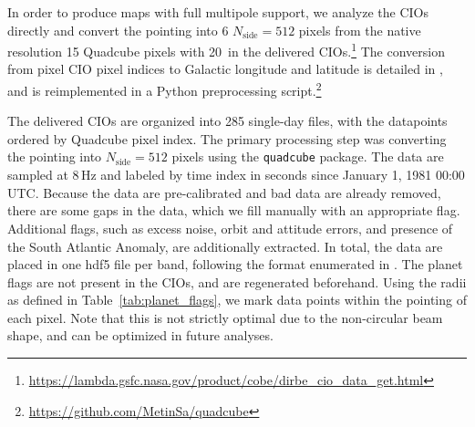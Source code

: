 \documentclass{aa}
\begin{document}
In order to produce maps with full multipole support, we analyze the CIOs directly and convert the pointing into 6 $N_\mathrm{side}=512$ pixels from the native resolution 15 Quadcube pixels with 20\arcs\ in the delivered CIOs.\footnote{\url{https://lambda.gsfc.nasa.gov/product/cobe/dirbe\_cio\_data\_get.html}} The conversion from pixel CIO pixel indices to Galactic longitude and latitude is detailed in \citet{cobe_exsupp}, and is reimplemented in a Python preprocessing script.\footnote{\url{https://github.com/MetinSa/quadcube}}

The delivered CIOs are organized into 285 single-day files, with the datapoints ordered by Quadcube pixel index. The primary processing step was converting the pointing into $N_\mathrm{side}=512$ pixels using the \texttt{quadcube} package. The data are sampled at 8\,Hz and labeled by time index in seconds since January 1, 1981 00:00 UTC. Because the data are pre-calibrated and bad data are already removed, there are some gaps in the data, which we fill manually with an appropriate flag. Additional flags, such as excess noise, orbit and attitude errors, and presence of the South Atlantic Anomaly, are additionally extracted. In total, the data are placed in one hdf5 file per band, following the format enumerated in \citet{bp03}.
The planet flags are not present in the CIOs, and are regenerated beforehand. Using the radii as defined in Table~\ref{tab:planet_flags}, we mark data points within the pointing of each pixel. Note that this is not strictly optimal due to the non-circular beam shape, and can be optimized in future analyses.



\end{document}
